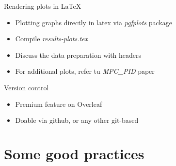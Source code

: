 \documentclass{beamer}
\begin{document}
\begin{frame}{Rendering plots in \LaTeX}
\begin{itemize}
    \item Plotting graphs directly in latex via \emph{pgfplots} package
    \item Compile \emph{results-plots.tex}
    \item Discuss the data preparation with headers
    \item For additional plots, refer tu \emph{MPC\_PID} paper
    \end{itemize}
\end{frame}

\begin{frame}{Version control}
\begin{itemize}
    \item Premium feature on Overleaf
    \item Doable via github, or any other git-based
\end{itemize}
    
\end{frame}



\section{Some good practices}
\end{document}
